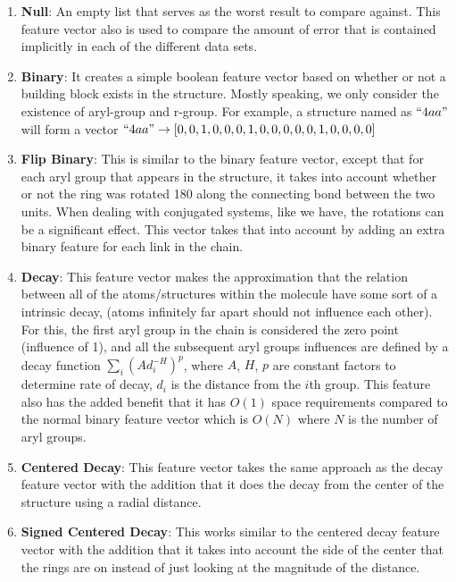 \documentclass[12pt, oneside]{article}   	%
\begin{document}
\begin{enumerate}
\item \textbf{Null}: An empty list that serves as the worst result to compare against. This feature vector also is used to compare the amount of error that is contained implicitly in each of the different data sets.

\item \textbf{Binary}: It creates a simple boolean feature vector based on whether or not a building block exists in the structure. Mostly speaking, we only consider the existence of aryl-group and r-group. For example, a structure named as $``4aa"$ will form a vector $``4aa" \to [0, 0, 1, 0, 0, 0, 1, 0, 0, 0, 0, 0, 1, 0, 0, 0, 0]$

\item \textbf{Flip Binary}: This is similar to the binary feature vector, except that for each aryl group that appears in the structure, it takes into account whether or not the ring was rotated 180 along the connecting bond between the two units. When dealing with conjugated systems, like we have, the rotations can be a significant effect. This vector takes that into account by adding an extra binary feature for each link in the chain.

\item \textbf{Decay}: This feature vector makes the approximation that the relation between all of the atoms/structures within the molecule have some sort of a intrinsic decay, (atoms infinitely far apart should not influence each other). For this, the first aryl group in the chain is considered the zero point (influence of 1), and all the subsequent aryl groups influences are defined by a decay function $\sum_{i} (Ad_{i}^{-H})^{p}$, where $A$, $H$, $p$ are constant factors to determine rate of decay, $d_{i}$ is the distance from the $i$th group. This feature also has the added benefit that it has $O(1)$ space requirements compared to the normal binary feature vector which is $O(N)$ where $N$ is the number of aryl groups.

\item \textbf{Centered Decay}: This feature vector takes the same approach as the decay feature vector with the addition that it does the decay from the center of the structure using a radial distance.

\item \textbf{Signed Centered Decay}: This works similar to the centered decay feature vector with the addition that it takes into account the side of the center that the rings are on instead of just looking at the magnitude of the distance.

\end{enumerate}
\end{document}
